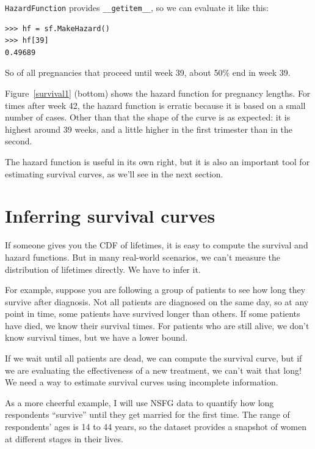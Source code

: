 \documentclass[12pt]{book}
\theoremstyle{exercise}
\begin{document}
{\tt HazardFunction} provides \verb"__getitem__", so we can evaluate
it like this:

\begin{verbatim}
>>> hf = sf.MakeHazard()
>>> hf[39]
0.49689
\end{verbatim}

So of all pregnancies that proceed until week 39, about
50\% end in week 39.

Figure~\ref{survival1} (bottom) shows the hazard function for
pregnancy lengths.  For times after week 42, the hazard function
is erratic because it is based on a small number of cases.
Other than that the shape of the curve is as expected: it is
highest around 39 weeks, and a little higher in the first
trimester than in the second.%

The hazard function is useful in its own right, but it is also an
important tool for estimating survival curves, as we'll see in the
next section.


\section{Inferring survival curves}

If someone gives you the CDF of lifetimes, it is easy to compute the
survival and hazard functions.  But in many real-world
scenarios, we can't measure the distribution of lifetimes directly.
We have to infer it.%
%

For example, suppose you are following a group of patients to see how
long they survive after diagnosis.  Not all patients are diagnosed on
the same day, so at any point in time, some patients have survived
longer than others.  If some patients have died, we know their
survival times.  For patients who are still alive, we don't know
survival times, but we have a lower bound.%

If we wait until all patients are dead, we can compute the survival
curve, but if we are evaluating the effectiveness of a new treatment,
we can't wait that long!  We need a way to estimate survival curves
using incomplete information.%

As a more cheerful example, I will use NSFG data to quantify how
long respondents ``survive'' until they get married for the
first time.  The range of respondents' ages is 14 to 44 years, so
the dataset provides a snapshot of women at different stages in their
lives.%
\end{document}
